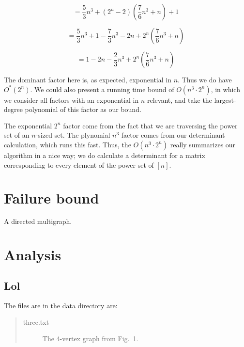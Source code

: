 \documentclass{tufte-handout}
\begin{document}
$$
= \frac{5}{3}n^3 + (2^n - 2)(\frac{7}{6}n^3 + n) + 1
$$

$$
= \frac{5}{3}n^3 + 1 - \frac{7}{3}n^3 - 2n + 2^n(\frac{7}{6}n^3 + n)
$$

$$
= 1 - 2n - \frac{2}{3}n^3 + 2^n(\frac{7}{6}n^3 + n)
$$

The dominant factor here is, as expected, exponential in $n$. Thus we do have $O^*(2^n)$. We could also present a running time bound of $O(n^3\cdot2^n)$, in which we consider all factors with an exponential in $n$ relevant, and take the largest-degree polynomial of this factor as our bound.

The exponential $2^n$ factor come from the fact that we are traversing the power set of an $n$-sized set. The plynomial $n^3$ factor comes from our determinant calculation, which runs this fast. Thus, the $O(n^3\cdot2^n)$ really summarizes our algorithm in a nice way; we do calculate a determinant for a matrix corresponding to every element of the power set of $[n]$.

\newpage
\section{Failure bound}



\begin{marginfigure}
\caption{A directed multigraph.}
\end{marginfigure}

\section{Analysis}

\subsection{Lol}

The files are in the data directory are:
\begin{quotation}
\begin{description}
\item[three.txt] The 4-vertex graph from Fig.~1.
\end{description}
\end{quotation}
\end{document}
